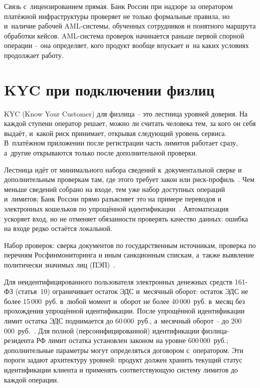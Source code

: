 Связь с~лицензированием прямая. Банк России при надзоре за
оператором платёжной инфраструктуры проверяет не только формальные
правила, но и~наличие рабочей AML-системы, обученных сотрудников
и понятного маршрута обработки кейсов. AML-система проверок начинается раньше
первой спорной операции -- она определяет, кого продукт вообще
впускает и~на каких условиях продолжает работу.

\section{KYC при подключении физлиц}\label{sec:compliance-kyc}

KYC (Know Your Customer) для физлица -- это лестница уровней
доверия. На каждой ступени оператор решает, можно ли считать
человека тем, за кого он себя выдаёт, и~какой риск принимает,
открывая следующий уровень сервиса. В~платёжном приложении после
регистрации часть лимитов работает сразу, а~другие открываются
только после дополнительной проверки.

Лестница идёт от минимального набора сведений к~документальной
сверке и дополнительным проверкам там, где этого требует закон или
риск-профиль~\cite{cbr-499p}. Чем меньше сведений собрано на входе,
тем уже набор доступных операций и~лимитов; Банк России прямо
разъясняет это на примере переводов и электронных кошельков по
упрощённой идентификации~\cite{cbr-banking-faq-identification}.
Автоматизация ускоряет вход, но не отменяет обязанности проверять
качество данных: ошибка на входе редко остаётся локальной.

Набор проверок: сверка документов
по государственным источникам, проверка по перечням
Росфинмониторинга и иным санкционным спискам, а~также выявление
политически значимых лиц (ПЭП)~\cite{cbr-499p,fatf-pep-guidance}.


Для неидентифицированного пользователя электронных денежных
средств 161-ФЗ (статья~10) ограничивает остаток ЭДС и~месячный
оборот: остаток ЭДС не более 15\,000~руб. в~любой момент
и~оборот не более 40\,000~руб. в~месяц без прохождения
упрощённой идентификации. После упрощённой идентификации
лимит остатка ЭДС поднимается до 60\,000~руб., а~месячный
оборот -- до 200\,000~руб.~\cite{fz-161}. Для полной
(персонифицированной) идентификации физлица-резидента РФ
лимит остатка установлен законом на уровне 600\,000~руб.;
дополнительные параметры могут определяться договором
с~оператором. Эти пороги задают архитектуру уровней: продукт
должен хранить текущий статус идентификации клиента и применять
соответствующую систему лимитов до каждой операции.

